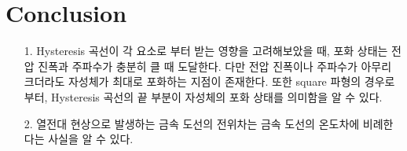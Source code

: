\documentclass[aps,reprint,superscriptaddress,10pt]{revtex4-2}
\begin{document}
\section{Conclusion}
\begin{itemize}
  \item[1. ] Hysteresis 곡선이 각 요소로 부터 받는 영향을 고려해보았을 때,
  포화 상태는 전압 진폭과 주파수가 충분히 클 때 도달한다. 다만 전압 진폭이나
  주파수가 아무리 크더라도 자성체가 최대로 포화하는 지점이 존재한다.
  또한 square 파형의 경우로부터, Hysteresis 곡선의 끝 부분이 자성체의 포화 상태를
  의미함을 알 수 있다.
  \item[2. ] 열전대 현상으로 발생하는 금속 도선의 전위차는 금속 도선의 온도차에
  비례한다는 사실을 알 수 있다.
  
  
\end{itemize}


% 




\vfill
\end{document}
